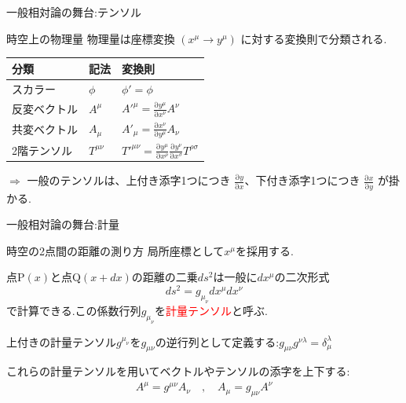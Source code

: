 \documentclass[unicode, aspectratio=169, 12pt]{beamer}
\newcommand{\pdiff}[2]{\frac{\mathrm{\partial} #1}{\mathrm{\partial} #2}} %
\begin{document}
\begin{frame}{一般相対論の舞台:テンソル}
    \begin{block}{時空上の物理量}
        物理量は座標変換 $(x^\mu \to y^\mu)$ に対する変換則で分類される.
        
        \vspace{0.4em}
        \centering
        \renewcommand{\arraystretch}{1.5}
        \small
        \begin{tabular}{lll}
            \hline
            分類 & 記法 & 変換則 \\
            \hline
            スカラー & $\phi$ & $\phi' = \phi$ \\
            反変ベクトル & $A^\mu$ & $A'^\mu = \pdiff{y^\mu}{x^\nu} A^\nu$ \\
            共変ベクトル & $A_\mu$ & $A'_\mu = \pdiff{x^\nu}{y^\mu} A_\nu$ \\
            2階テンソル & $T^{\mu\nu}$ & $T'^{\mu\nu} = \pdiff{y^\mu}{x^\rho} \pdiff{y^\nu}{x^\sigma} T^{\rho\sigma}$ \\
            \hline
        \end{tabular}
        \vspace{0.3em}
    \end{block}
    \vspace{0.3em}
    $\Rightarrow$ 一般のテンソルは、上付き添字1つにつき $\pdiff{y}{x}$、下付き添字1つにつき $\pdiff{x}{y}$ が掛かる.
\end{frame}


\begin{frame}{一般相対論の舞台:計量}
    \begin{block}{時空の2点間の距離の測り方}
        局所座標として$x^\mu$を採用する.

        点P$(x)$と点Q$(x + dx)$の距離の二乗$ds^2$は一般に$dx^\mu$の二次形式
        \begin{equation*}
            ds^2 = g_{\mu_\nu} dx^\mu dx^\nu
        \end{equation*}
        で計算できる.この係数行列$g_{\mu_\nu}$を\textcolor{red}{計量テンソル}と呼ぶ.

        上付きの計量テンソル$g^{\mu_\nu}$を$g_{\mu\nu}$の逆行列として定義する:\>$g_{\mu\nu}g^{\nu\lambda}=\delta^\lambda_\mu$

        これらの計量テンソルを用いてベクトルやテンソルの添字を上下する:
        \begin{align*}
            A^\mu = g^{\mu\nu}A_\nu \quad,\quad A_\mu = g_{\mu\nu}A^\nu
        \end{align*}
    \end{block}
\end{frame}
\end{document}
